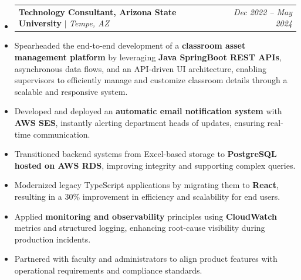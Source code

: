 \documentclass[a4paper,10pt]{article}
\makeatletter
\newcommand{\resumeSubheading}[4]{
  \vspace{-1pt}\item
    \begin{tabular*}{\linewidth}{l@{\extracolsep{\fill}}r}
      \textbf{#1} $|$ \textit{#2} & \textit{#4} \\
    \end{tabular*}\vspace{-4pt}
}
\newcommand{\textbulletlight}{\raisebox{0.15ex}{\scalebox{0.6}{$\bullet$}}}
\makeatother
\begin{document}
\vspace{-2pt}
\begin{itemize}[leftmargin=0pt, rightmargin=0pt, label={}, itemsep=0pt]
    \resumeSubheading{Technology Consultant, Arizona State University}{Tempe, AZ}
    {}{Dec 2022 -- May 2024}
\end{itemize}\vspace{-6pt}
\begin{itemize}[leftmargin=12pt, rightmargin=0pt, label={\textbulletlight}, itemsep=0pt, topsep=2pt]
        \item \small Spearheaded the end-to-end development of a \textbf{classroom asset management platform} by leveraging \textbf{Java SpringBoot REST APIs}, asynchronous data flows, and an API-driven UI architecture, enabling supervisors to efficiently manage and customize classroom details through a scalable and responsive system.
        \item Developed and deployed an \textbf{automatic email notification system} with \textbf{AWS SES}, instantly alerting department heads of updates, ensuring real-time communication.
        \item Transitioned backend systems from Excel-based storage to \textbf{PostgreSQL hosted on AWS RDS}, improving integrity and supporting complex queries.
        \item Modernized legacy TypeScript applications by migrating them to \textbf{React}, resulting in a 30\% improvement in efficiency and scalability for end users.
        \item Applied \textbf{monitoring and observability} principles using \textbf{CloudWatch} metrics and structured logging, enhancing root-cause visibility during production incidents.
        \item Partnered with faculty and administrators to align product features with operational requirements and compliance standards.
\end{itemize}
\end{document}
